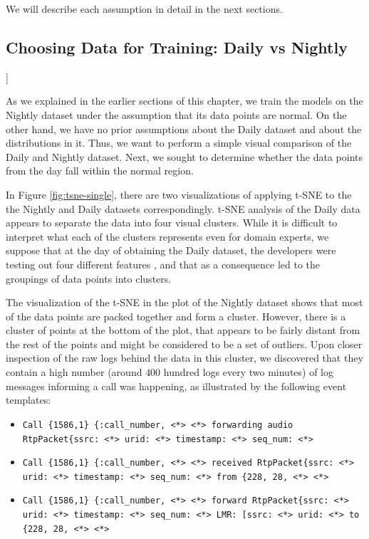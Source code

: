 We will describe each assumption in detail in the next sections.

\subsection{Choosing Data for Training: Daily vs Nightly}]
\label{assumption-daily-vs-nightly}

As we explained in the earlier sections of this chapter, we train the models on the Nightly dataset under the assumption that its data points are normal. On the other hand, we have no prior assumptions about the Daily dataset and about the distributions in it. Thus, we want to perform a simple visual comparison of the Daily and Nightly dataset. Next, we sought to determine whether the data points from the day fall within the normal region.

In Figure \ref{fig:tsne-single}, there are two visualizations of applying t-SNE to the the Nightly and Daily datasets correspondingly. t-SNE analysis of the Daily data appears to separate the data into four visual clusters. While it is difficult to interpret what each of the clusters represents even for domain experts, we suppose that at the day of obtaining the Daily dataset, the developers were testing out four different features , and that as a consequence led to the groupings of data points into clusters.

The visualization of the t-SNE in the plot of the Nightly dataset shows that most of the data points are packed together and form a cluster. However, there is a cluster of points at the bottom of the plot, that appears to be fairly distant from the rest of the points and might be considered to be a set of outliers. Upon closer inspection of the raw logs behind the data in this cluster, we discovered that they contain a high number (around $400$ hundred logs every two minutes) of log messages informing a call was happening, as illustrated by the following event templates:

\begin{itemize}
    \item \texttt{\justify Call \{1586,1\} \{:call\_number, <*> <*> forwarding audio RtpPacket\{ssrc: <*> urid: <*> timestamp: <*> seq\_num: <*>}
    \item \texttt{\justify Call \{1586,1\} \{:call\_number, <*> <*> received RtpPacket\{ssrc: <*> urid: <*> timestamp: <*> seq\_num: <*> from \{228, 28, <*> <*>}
    \item \texttt{\justify Call \{1586,1\} \{:call\_number, <*> <*> forward RtpPacket\{ssrc: <*> urid: <*> timestamp: <*> seq\_num: <*> LMR: [ssrc: <*> urid: <*> to \{228, 28, <*> <*>}
\end{itemize}

